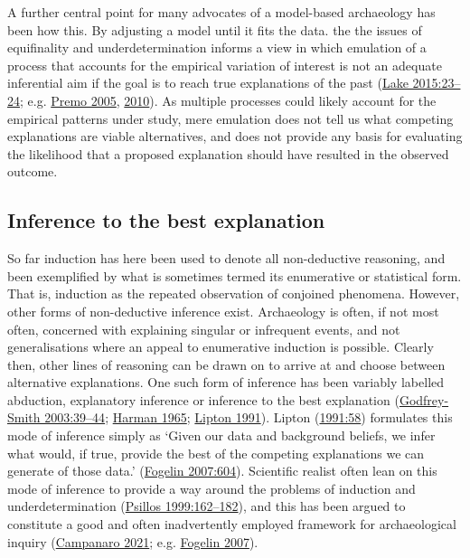 \documentclass[
  a4paper,
  oneside]{uiophdthesis}
\begin{document}
A further central point for many advocates of a model-based archaeology has been how this. By adjusting a model until it fits the data. the the issues of equifinality and underdetermination informs a view in which emulation of a process that accounts for the empirical variation of interest is not an adequate inferential aim if the goal is to reach true explanations of the past (\protect\hyperlink{ref-lake2015}{Lake 2015:23--24}; e.g. \protect\hyperlink{ref-premo2005}{Premo 2005}, \protect\hyperlink{ref-premo2010}{2010}). As multiple processes could likely account for the empirical patterns under study, mere emulation does not tell us what competing explanations are viable alternatives, and does not provide any basis for evaluating the likelihood that a proposed explanation should have resulted in the observed outcome.

\hypertarget{inference-to-the-best-explanation}{%
\subsection{Inference to the best explanation}\label{inference-to-the-best-explanation}}

So far induction has here been used to denote all non-deductive reasoning, and been exemplified by what is sometimes termed its enumerative or statistical form. That is, induction as the repeated observation of conjoined phenomena. However, other forms of non-deductive inference exist. Archaeology is often, if not most often, concerned with explaining singular or infrequent events, and not generalisations where an appeal to enumerative induction is possible. Clearly then, other lines of reasoning can be drawn on to arrive at and choose between alternative explanations. One such form of inference has been variably labelled abduction, explanatory inference or inference to the best explanation (\protect\hyperlink{ref-godfrey-smith2003}{Godfrey-Smith 2003:39--44}; \protect\hyperlink{ref-harman1965}{Harman 1965}; \protect\hyperlink{ref-lipton1991}{Lipton 1991}). Lipton (\protect\hyperlink{ref-lipton1991}{1991:58}) formulates this mode of inference simply as `Given our data and background beliefs, we infer what would, if true, provide the best of the competing explanations we can generate of those data.' (\protect\hyperlink{ref-fogelin2007}{Fogelin 2007:604}). Scientific realist often lean on this mode of inference to provide a way around the problems of induction and underdetermination (\protect\hyperlink{ref-psillos1999}{Psillos 1999:162--182}), and this has been argued to constitute a good and often inadvertently employed framework for archaeological inquiry (\protect\hyperlink{ref-campanaro2021}{Campanaro 2021}; e.g. \protect\hyperlink{ref-fogelin2007}{Fogelin 2007}).
\end{document}

